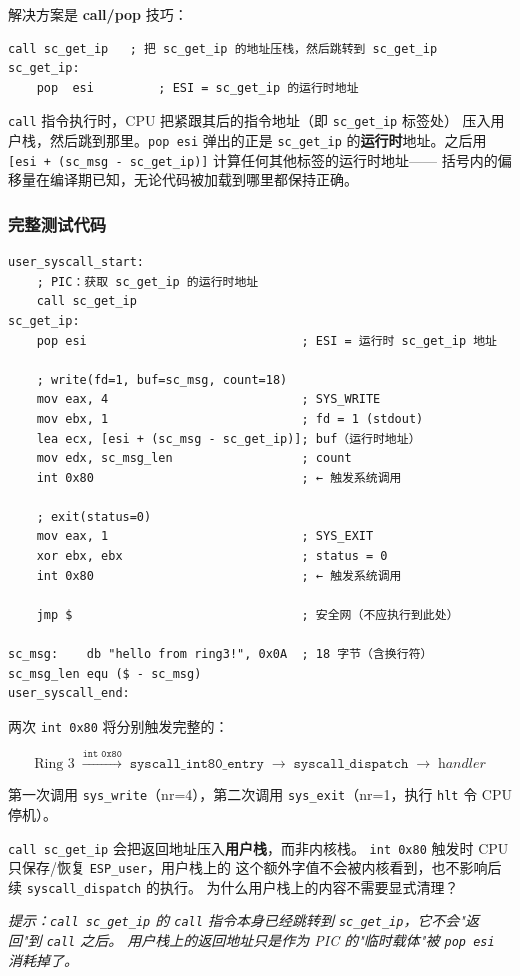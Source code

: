解决方案是 \textbf{call/pop} 技巧：

\begin{lstlisting}[style=nasmstyle]
    call sc_get_ip   ; 把 sc_get_ip 的地址压栈，然后跳转到 sc_get_ip
sc_get_ip:
    pop  esi         ; ESI = sc_get_ip 的运行时地址
\end{lstlisting}

\texttt{call} 指令执行时，CPU 把紧跟其后的指令地址（即 \texttt{sc\_get\_ip} 标签处）
压入用户栈，然后跳到那里。\texttt{pop esi} 弹出的正是 \texttt{sc\_get\_ip}
的\textbf{运行时}地址。之后用
\texttt{[esi + (sc\_msg - sc\_get\_ip)]} 计算任何其他标签的运行时地址——
括号内的偏移量在编译期已知，无论代码被加载到哪里都保持正确。

\subsubsection{完整测试代码}

\begin{lstlisting}[style=nasmstyle]
user_syscall_start:
    ; PIC：获取 sc_get_ip 的运行时地址
    call sc_get_ip
sc_get_ip:
    pop esi                              ; ESI = 运行时 sc_get_ip 地址

    ; write(fd=1, buf=sc_msg, count=18)
    mov eax, 4                           ; SYS_WRITE
    mov ebx, 1                           ; fd = 1 (stdout)
    lea ecx, [esi + (sc_msg - sc_get_ip)]; buf（运行时地址）
    mov edx, sc_msg_len                  ; count
    int 0x80                             ; ← 触发系统调用

    ; exit(status=0)
    mov eax, 1                           ; SYS_EXIT
    xor ebx, ebx                         ; status = 0
    int 0x80                             ; ← 触发系统调用

    jmp $                                ; 安全网（不应执行到此处）

sc_msg:    db "hello from ring3!", 0x0A  ; 18 字节（含换行符）
sc_msg_len equ ($ - sc_msg)
user_syscall_end:
\end{lstlisting}

两次 \texttt{int 0x80} 将分别触发完整的：

\[
\text{Ring~3} \;\xrightarrow{\texttt{int 0x80}}\; \texttt{syscall\_int80\_entry}
  \;\to\; \texttt{syscall\_dispatch} \;\to\; \textit{handler}
\]

第一次调用 \texttt{sys\_write}（nr=4），第二次调用 \texttt{sys\_exit}（nr=1，执行
\texttt{hlt} 令 CPU 停机）。

\begin{thinkbox}
\texttt{call sc\_get\_ip} 会把返回地址压入\textbf{用户栈}，而非内核栈。
\texttt{int 0x80} 触发时 CPU 只保存/恢复 \texttt{ESP\_user}，用户栈上的
这个额外字值不会被内核看到，也不影响后续 \texttt{syscall\_dispatch} 的执行。
为什么用户栈上的内容不需要显式清理？

\emph{提示：\texttt{call sc\_get\_ip} 的 \texttt{call} 指令本身已经跳转到
\texttt{sc\_get\_ip}，它不会"返回"到 \texttt{call} 之后。
用户栈上的返回地址只是作为 PIC 的"临时载体"被 \texttt{pop esi} 消耗掉了。}
\end{thinkbox}
